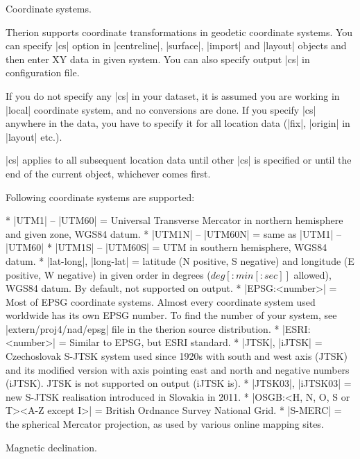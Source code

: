 \subchapter Coordinate systems.

Therion supports coordinate transformations in geodetic coordinate systems.
You can specify |cs| option in |centreline|, |surface|, |import| and 
|layout| objects and then enter XY data in given system. 
You can also specify output |cs| in configuration file. 

If you do not specify any |cs| in your dataset, 
it is assumed you are working in |local| coordinate system, and no 
conversions are done. If you specify |cs| anywhere in the data, you have to
specify it for all location data (|fix|, |origin| in |layout| etc.). 

|cs| applies to all subsequent location data until other |cs| is specified or
until the end of the current object, whichever comes first.

Following coordinate systems are supported:

\list
* |UTM1| -- |UTM60| = Universal Transverse Mercator in northern hemisphere
  and given zone, WGS84 datum. 
* |UTM1N| -- |UTM60N| = same as |UTM1| -- |UTM60|
* |UTM1S| -- |UTM60S| = UTM in southern hemisphere, WGS84 datum.
* |lat-long|, |long-lat| = latitude (N positive, S negative) and 
  longitude (E positive, W negative) in given order in degrees 
  ($deg[{:}min[{:}sec]]$ allowed), WGS84 datum. By default, not 
  supported on output.
* |EPSG:<number>| = Most of EPSG coordinate systems. Almost every 
  coordinate system used worldwide has its own EPSG number. To find
  the number of your system, see |extern/proj4/nad/epsg| file in the
  therion source distribution.
* |ESRI:<number>| = Similar to EPSG, but ESRI standard.
* |JTSK|, |iJTSK| = Czechoslovak S-JTSK system used since 1920s with south and west
  axis (JTSK) and its modified version with axis 
  pointing east and north and negative numbers (iJTSK). JTSK is
  not supported on output (iJTSK is).
* |JTSK03|, |iJTSK03| = new S-JTSK realisation introduced in Slovakia in 2011.
* |OSGB:<H, N, O, S or T><A-Z except I>| = British Ordnance Survey National
  Grid.
* |S-MERC| = the spherical Mercator projection, as used by various online mapping sites.
\endlist

\subchapter Magnetic declination.

